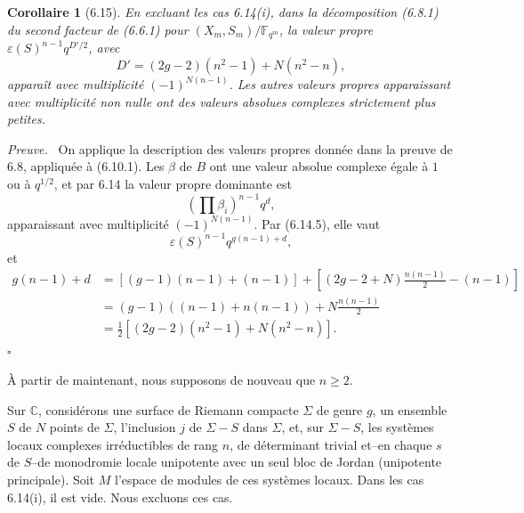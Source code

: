 \documentclass[10pt]{article}
\newcommand{\Fb}{\mathbb F}
\newcommand{\C}{\mathbb C}
\theoremstyle{deligne}
\newtheorem*{corollary*}{Corollaire}
\newenvironment{proofdel}[1][Preuve.]{\textit{#1}\ }{\hfill$\square$}
\newcommand{\heading}[1]{\vspace{0.7em}\noindent{\bfseries #1}\quad}
\begin{document}
\begin{corollary*}[6.15]
En excluant les cas 6.14(i), dans la décomposition (6.8.1) du second facteur de (6.6.1) pour $(X_m,S_m)/\Fb_{q^m}$, la valeur propre $\varepsilon(S)^{n-1}q^{D'/2}$, avec
\[
D'=(2g-2)(n^2-1)+N(n^2-n),
\]
apparaît avec multiplicité $(-1)^{N(n-1)}$. Les autres valeurs propres apparaissant avec multiplicité non nulle ont des valeurs absolues complexes strictement plus petites.
\end{corollary*}
\begin{proofdel}
On applique la description des valeurs propres donnée dans la preuve de 6.8, appliquée à (6.10.1). Les $\beta$ de $B$ ont une valeur absolue complexe égale à $1$ ou à $q^{1/2}$, et par 6.14 la valeur propre dominante est
\[
\left(\prod\beta_i\right)^{n-1}q^d,
\]
apparaissant avec multiplicité $(-1)^{N(n-1)}$. Par (6.14.5), elle vaut
\[
\varepsilon(S)^{n-1}q^{g(n-1)+d},
\]
et
\begin{align*}
g(n-1)+d&=[(g-1)(n-1)+(n-1)]+\left[(2g-2+N)\frac{n(n-1)}2-(n-1)\right]\\
&=(g-1)((n-1)+n(n-1))+N\frac{n(n-1)}2\\
&=\frac12[(2g-2)(n^2-1)+N(n^2-n)].
\end{align*}
\end{proofdel}

À partir de maintenant, nous supposons de nouveau que $n\ge2$.

\heading{6.16.} Sur $\C$, considérons une surface de Riemann compacte $\Sigma$ de genre $g$, un ensemble $S$ de $N$ points de $\Sigma$, l'inclusion $j$ de $\Sigma-S$ dans $\Sigma$, et, sur $\Sigma-S$, les systèmes locaux complexes irréductibles de rang $n$, de déterminant trivial et--en chaque $s$ de $S$--de monodromie locale unipotente avec un seul bloc de Jordan (unipotente principale). Soit $M$ l'espace de modules de ces systèmes locaux. Dans les cas 6.14(i), il est vide. Nous excluons ces cas.
\end{document}
